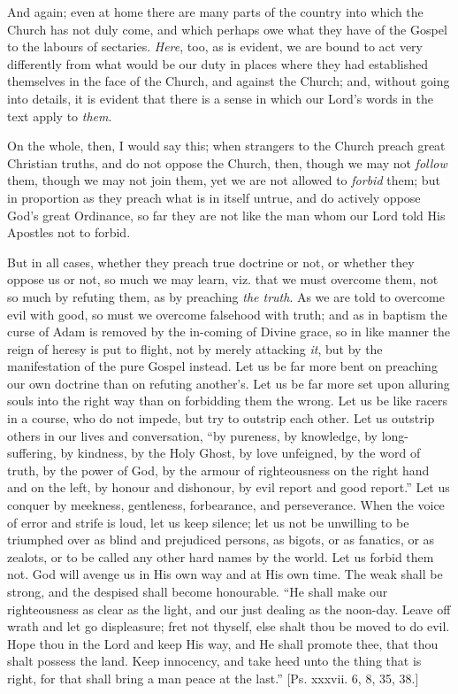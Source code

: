 And again; even at home there are many parts of the country into
which the Church has not duly come, and which perhaps owe what they
have of the Gospel to the labours of sectaries. \emph{Here}, too, as
is evident, we are bound to act very differently from what would be
our duty in places where they had established themselves in the face
of the Church, and against the Church; and, without going into
details, it is evident that there is a sense in which our Lord's words
in the text apply to \emph{them}.

On the whole, then, I would say this; when strangers to the Church
preach great Christian truths, and do not oppose the Church, then,
though we may not \emph{follow} them, though we may not join them, yet
we are not allowed to \emph{forbid} them; but in proportion as they preach
what is in itself untrue, and do actively oppose God's great
Ordinance, so far they are not like the man whom our Lord told His
Apostles not to forbid.

But in all cases, whether they preach true doctrine or not, or
whether they oppose us or not, so much we may learn, viz. that we must
overcome them, not so much by refuting them, as by preaching \emph{the
truth}. As we are told to overcome evil with good, so must we
overcome falsehood with truth; and as in baptism the curse of Adam is
removed by the in-coming of Divine grace, so in like manner the reign
of heresy is put to flight, not by merely attacking \emph{it}, but by
the manifestation of the pure Gospel instead. Let us be far more bent
on preaching our own doctrine than on refuting another's. Let us be
far more set upon alluring souls into the right way than on forbidding
them the wrong. Let us be like racers in a course, who do not impede,
but try to outstrip each other. Let us outstrip others in our lives
and conversation, ``by pureness, by knowledge, by long-suffering,
by kindness, by the Holy Ghost, by love unfeigned, by the word of
truth, by the power of God, by the armour of righteousness on the
right hand and on the left, by honour and dishonour, by evil report
and good report.'' Let us conquer by meekness, gentleness,
forbearance, and perseverance. When the voice of error and strife is
loud, let us keep silence; let us not be unwilling to be triumphed
over as blind and prejudiced persons, as bigots, or as fanatics, or as
zealots, or to be called any other hard names by the world. Let us
forbid them not. God will avenge us in His own way and at His own
time. The weak shall be strong, and the despised shall become
honourable. ``He shall make our righteousness as clear as the
light, and our just dealing as the noon-day. Leave off wrath and let
go displeasure; fret not thyself, else shalt thou be moved to do evil.
Hope thou in the Lord and keep His way, and He shall promote thee,
that thou shalt possess the land. Keep innocency, and take heed unto
the thing that is right, for that shall bring a man peace at the
last.'' [Ps. xxxvii. 6, 8, 35, 38.]

